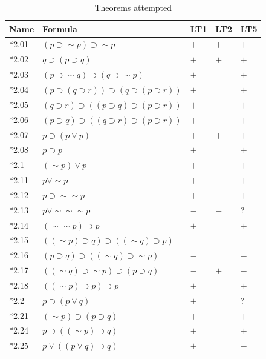 \documentclass[journal]{IEEEtran}
\begin{document}
\def\Y{$+$}
\def\N{$-$}

\begin{table}[h]
\centering
\caption{Theorems attempted}
\label{tab:results}
\begin{tabular}{lllll}
\toprule
\textbf{Name} & \textbf{Formula} & \textbf{LT1} & \textbf{LT2}\cite{LT1957} & \textbf{LT5} \\
\midrule
*2.01 & $(p \supset \sim p) \supset \sim p $ & \Y & \Y \cite[p.~219]{LT1957} & \Y \\
*2.02 & $q \supset (p \supset q) $ & \Y & \Y \cite[p.~224]{LT1957} & \Y \\
*2.03 & $(p \supset \sim q) \supset (q \supset \sim p) $ & \Y & \ & \Y \\
*2.04 & $(p \supset (q \supset r)) \supset (q \supset (p \supset r)) $ & \Y & \ & \Y \\
*2.05 & $(q \supset r) \supset ((p \supset q) \supset (p \supset r)) $ & \Y& \ & \Y \\
*2.06 & $(p \supset q) \supset ((q \supset r) \supset (p \supset r)) $ & \Y& \ & \Y \\
*2.07 & $p \supset (p \vee p) $ & \Y & \Y \cite[p.~226]{LT1957} & \Y \\
*2.08 & $p \supset p $ & \Y & \ & \Y \\
*2.1 & $ (\sim p) \vee p $ & \Y & \ & \Y \\
*2.11 & $p \vee \sim p $ & \Y & \ & \Y \\
*2.12 & $p \supset \sim \sim p $ & \Y & \ & \Y \\
*2.13 & $p \vee \sim \sim \sim p $ & \N & \N \cite[p.~222]{LT1957} & ? \\
*2.14 & $ (\sim \sim p) \supset p $ & \Y & \ & \Y \\
*2.15 & $( (\sim p )\supset q) \supset ( (\sim q) \supset p) $ & \N & \ & \N \\
*2.16 & $(p \supset q) \supset ( (\sim q) \supset \sim p) $ & \N & \ & \N \\
*2.17 & $( (\sim q) \supset \sim p) \supset (p \supset q) $ & \N & \Y \cite[p.~228]{LT1957} & \N \\
*2.18 & $( (\sim p )\supset p) \supset p $ & \Y & \ & \Y \\
*2.2 & $p \supset (p \vee q) $ & \Y & \ & ? \\
*2.21 & $ (\sim p) \supset (p \supset q) $ & \Y & \ & \Y \\
*2.24 & $p \supset ( (\sim p) \supset q) $ & \Y & \ & \Y \\
*2.25 & $p \vee ((p \vee q) \supset q) $ & \Y & \ & \N \\

\end{tabular}
\end{table}
\end{document}
